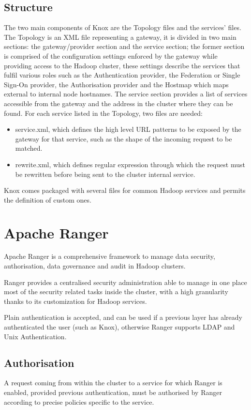 \subsection{Structure}
The two main components of Knox are the Topology files and the services' files.
\newline
The Topology is an XML file representing a gateway, it is divided in two main sections: the gateway/provider section and the service section; the former section is comprised of the configuration settings enforced by the gateway while providing access to the Hadoop cluster, these settings describe the services that fulfil various roles such as the Authentication provider, the Federation or Single Sign-On provider, the Authorisation provider and the Hostmap which maps external to internal node hostnames.
The service section provides a list of services accessible from the gateway and the address in the cluster where they can be found.
\newline
For each service listed in the Topology, two files are needed: 
\begin{itemize}
	\item service.xml, which defines the high level URL patterns to be exposed by the gateway for that service, such as the shape of the incoming request to be matched.
	\item rewrite.xml, which defines regular expression through which the request must be rewritten before being sent to the cluster internal service.
\end{itemize}
Knox comes packaged with several files for common Hadoop services and permits the definition of custom ones. 

\section{Apache Ranger}

Apache Ranger is a comprehensive framework to manage data security, authorisation, data governance and audit in Hadoop clusters.

Ranger provides a centralised security administration able to manage in one place most of the security related tasks inside the cluster, with a high granularity thanks to its customization for Hadoop services.

Plain authentication is accepted, and can be used if a previous layer has already authenticated the user (such as Knox), otherwise Ranger supports LDAP and Unix Authentication.

\subsection{Authorisation}
A request coming from within the cluster to a service for which Ranger is enabled, provided previous authentication, must be authorised by Ranger according to precise policies specific to the service.

